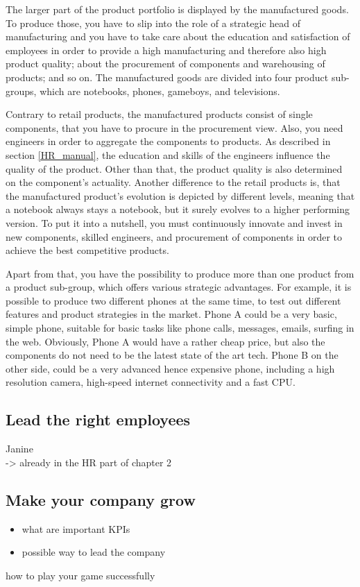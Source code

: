 \documentclass[11pt,titlepage,oneside,openany]{book}
\begin{document}
The larger part of the product portfolio is displayed by the manufactured goods. To produce those, you have to slip into the role of a strategic head of manufacturing and you have to take care about the education and satisfaction of employees in order to provide a high manufacturing and therefore also high product quality; about the procurement of components and warehousing of products; and so on.
The manufactured goods are divided into four product sub-groups, which are notebooks, phones, gameboys, and televisions. 

Contrary to retail products, the manufactured products consist of single components, that you have to procure in the procurement view. Also, you need engineers in order to aggregate the components to products. As described in section \ref{HR_manual}, the education and skills of the engineers influence the quality of the product. Other than that, the product quality is also determined on the component's actuality. Another difference to the retail products is, that the manufactured product's evolution is depicted by different levels, meaning that a notebook always stays a notebook, but it surely evolves to a higher performing version. To put it into a nutshell, you must continuously innovate and invest in new components, skilled engineers, and procurement of components in order to achieve the best competitive products. 

Apart from that, you have the possibility to produce more than one product from a product sub-group, which offers various strategic advantages. For example, it is possible to produce two different phones at the same time, to test out different features and product strategies in the market. Phone A could be a very basic, simple phone, suitable for basic tasks like phone calls, messages, emails, surfing in the web. Obviously, Phone A would have a rather cheap price, but also the components do not need to be the latest state of the art tech. Phone B on the other side, could be a very advanced hence expensive phone, including a high resolution camera, high-speed internet connectivity and a fast CPU.

\subsection{Lead the right employees}
Janine \\
-> already in the HR part of chapter 2

\subsection{Make your company grow}
\begin{itemize}
    \item what are important KPIs
    \item possible way to lead the company
\end{itemize}
how to play your game successfully
\end{document}

